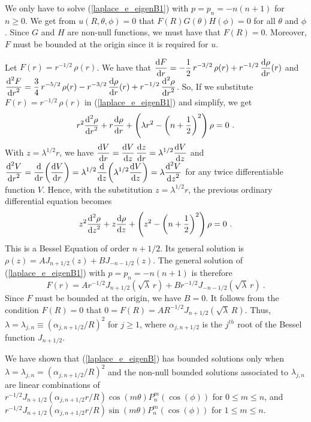 We only have to solve (\ref{laplace_e_eigenB1}) with $p=p_n=-n(n+1)$ for
$n \geq 0$.  We get from $u(R,\theta,\phi) = 0$ that
$F(R)G(\theta)H(\phi) = 0$ for all $\theta$ and $\phi$.
Since $G$ and $H$ are non-null functions, we must have that $F(R)=0$.
Moreover, $F$ must be bounded at the origin since it is required for $u$.

Let $\displaystyle F(r) = r^{-1/2}\,\rho(r)$.  We have that
$\displaystyle \dydx{F}{r} = -\frac{1}{2}\,r^{-3/2} \, \rho(r) +
r^{-1/2}\,\dydx{\rho}{r}(r)$ and\\
$\displaystyle \dydxn{F}{r}{2} = \frac{3}{4}\,r^{-5/2} \, \rho(r) -
r^{-3/2}\,\dydx{\rho}{r}(r) + r^{-1/2}\,\dydxn{\rho}{r}{2}$.
So, If we substitute $\displaystyle F(r) = r^{-1/2}\,\rho(r)$
in (\ref{laplace_e_eigenB1}) and simplify, we get
\[
r^2 \dydxn{\rho}{r}{2} + r \dydx{\rho}{r} + \left(\lambda r^2 -
  \left( n + \frac{1}{2}\right)^2\right)\rho = 0 \  .
\]
With $z = \lambda^{1/2} r$, we have
$\displaystyle
\dydx{V}{r} = \dydx{V}{z} \, \dydx{z}{r} = \lambda^{1/2} \dydx{V}{z}$
and
$\displaystyle \dydxn{V}{r}{2} = \dfdx{ \left( \dydx{V}{r}\right) }{r} =
\lambda^{1/2} \dfdx{ \left(\lambda^{1/2} \dydx{V}{z} \right) }{z}
= \lambda \dydxn{V}{z}{2}$
for any twice differentiable function $V$.  Hence, with the
substitution $z=\lambda^{1/2} r$, the previous ordinary differential equation becomes
\[
z^2 \dydxn{\rho}{z}{2} + z \dydx{\rho}{z} + \left( z^2 - 
\left( n + \frac{1}{2}\right)^2\right)\rho = 0 \  .
\]
This is a Bessel Equation of order $\displaystyle n + 1/2$.  Its
general solution is
$\displaystyle \rho(z) = A J_{n+1/2}(z) + B J_{-n-1/2}(z)$.
The general solution of (\ref{laplace_e_eigenB1}) with $p=p_n=-n(n+1)$ is
therefore
\[
F(r) = A r^{-1/2} J_{n+1/2}\left(\sqrt{\lambda}\, r\right)
+ B r^{-1/2} J_{-n-1/2}\left(\sqrt{\lambda}\, r\right) \  .
\]
Since $F$ must be bounded at the origin, we have $B=0$.  It
follows from the condition $F(R)=0$ that
$\displaystyle 0 = F(R) = A R^{-1/2} J_{n+1/2}\left(\sqrt{\lambda}\, R\right)$.
Thus, $\displaystyle \lambda = \lambda_{j,n} \equiv
\left(\alpha_{j,n+1/2}/R\right)^2$ for $j \geq 1$, where
$\alpha_{j,n+1/2}$ is the $j^{th}$ root of the Bessel function $J_{n+1/2}$.

We have shown that (\ref{laplace_e_eigenB}) has bounded solutions only when
$\displaystyle \lambda = \lambda_{j,n} =
\left(\alpha_{j,n+1/2}/R\right)^2$ and the non-null bounded
solutions associated to $\lambda_{j,n}$ are linear combinations of\\
$\displaystyle
r^{-1/2} J_{n+1/2}\left(\alpha_{j,n+1/2} r/R\right)
\cos(m\theta)P_n^m(\cos(\phi))$ for $0 \leq m \leq n$, and\\
$\displaystyle r^{-1/2} J_{n+1/2}\left(\alpha_{j,n+1/2} r/R\right)
\sin(m\theta)P_n^m(\cos(\phi))$ for $1 \leq m \leq n$.


